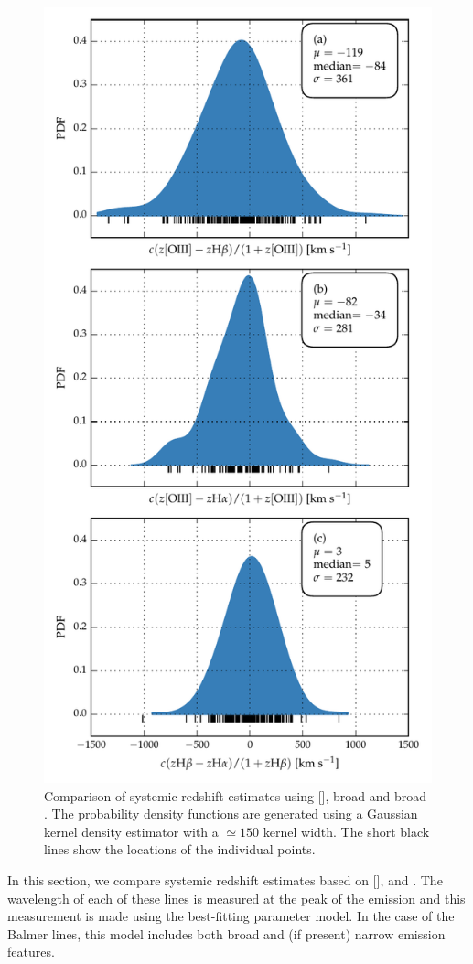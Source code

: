 \begin{figure}
    \centering
    \includegraphics[width=0.8\linewidth]{figures/chapter04/redshift_comparison.pdf} 
    \caption[{Comparison of systemic redshift estimates using [], broad \hb and broad \hans.}]{Comparison of systemic redshift estimates using [], broad \hb and broad \hans. The probability density functions are generated using a Gaussian kernel density estimator with a $\simeq150$ \kms kernel width. The short black lines show the locations of the individual points.}       
    \label{fig:redshift_comparison}
\end{figure}

In this section, we compare systemic redshift estimates based on [], \hb and \hans. 
The wavelength of each of these lines is measured at the peak of the emission and this measurement is made using the best-fitting parameter model. 
In the case of the Balmer lines, this model includes both broad and (if present) narrow emission features. 

